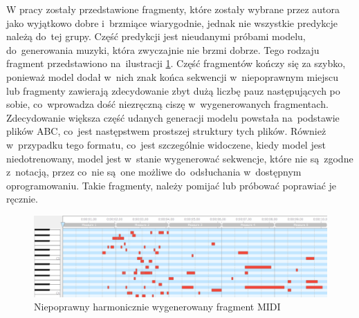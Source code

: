 \documentclass[data-science]{agh-wi} %
\begin{document}
W pracy zostały przedstawione fragmenty, które zostały wybrane przez autora jako wyjątkowo dobre i~brzmiące wiarygodnie, jednak nie wszystkie predykcje należą do~tej grupy. Część predykcji jest nieudanymi próbami modelu, do~generowania muzyki, która zwyczajnie nie brzmi dobrze. Tego rodzaju fragment przedstawiono na~ilustracji \ref*{fig:bad_midi}. Część fragmentów kończy się za szybko, ponieważ model dodał w~nich znak końca sekwencji w~niepoprawnym miejscu lub fragmenty zawierają zdecydowanie zbyt dużą liczbę pauz następujących po sobie, co~wprowadza dość niezręczną ciszę w~wygenerowanych fragmentach. Zdecydowanie większa część udanych generacji modelu powstała na~podstawie plików ABC, co~jest następstwem prostszej struktury tych plików. Również w~przypadku tego formatu, co~jest szczególnie widoczene, kiedy model jest niedotrenowany, model jest w~stanie wygenerować sekwencje, które nie są~zgodne z~notacją, przez co~nie są~one możliwe do~odsłuchania w~dostępnym oprogramowaniu. Takie fragmenty, należy pomijać lub próbować poprawiać je ręcznie.

\begin{figure}[ht!]
    \centering
    \includegraphics[width=0.9\linewidth]{./img/bad_midi.png}
    \caption{Niepoprawny harmonicznie wygenerowany fragment MIDI}
    \label{fig:bad_midi}
\end{figure}
\end{document}
